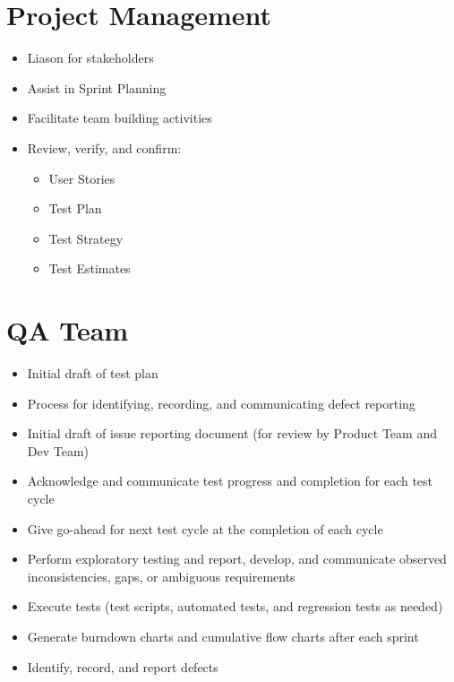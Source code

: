 \documentclass[letterpaper,10pt,english,openany,oneside]{sphinxmanual}
\begin{document}
\section{Project Management}
\label{\detokenize{test_plan/roles_and_responsibilities:project-management}}
\begin{itemize}
\item {} 
Liason for stakeholders

\item {} 
Assist in Sprint Planning

\item {} 
Facilitate team building activities

\item {} 
Review, verify, and confirm:
\begin{itemize}
\item {} 
User Stories

\item {} 
Test Plan

\item {} 
Test Strategy

\item {} 
Test Estimates

\end{itemize}

\end{itemize}


\section{QA Team}
\label{\detokenize{test_plan/roles_and_responsibilities:qa-team}}
\begin{itemize}
\item {} 
Initial draft of test plan

\item {} 
Process for identifying, recording, and communicating defect reporting

\item {} 
Initial draft of issue reporting document (for review by Product Team and Dev Team)

\item {} 
Acknowledge and communicate test progress and completion for each test cycle

\item {} 
Give go-ahead for next test cycle at the completion of each cycle

\item {} 
Perform exploratory testing and report, develop, and communicate observed inconsistencies, gaps, or ambiguous requirements

\item {} 
Execute tests (test scripts, automated tests, and regression tests as needed)

\item {} 
Generate burndown charts and cumulative flow charts after each sprint

\item {} 
Identify, record, and report defects

\end{itemize}
\end{document}
